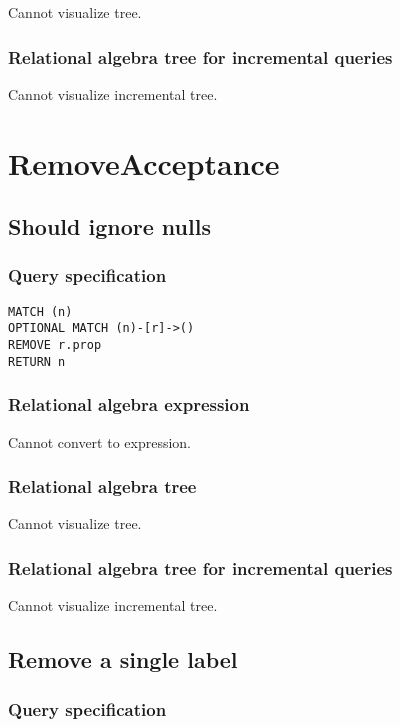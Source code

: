 Cannot visualize tree.

\subsubsection*{Relational algebra tree for incremental queries}

Cannot visualize incremental tree.

\section{RemoveAcceptance}

\subsection{Should ignore nulls}

\subsubsection*{Query specification}

\begin{lstlisting}
MATCH (n)
OPTIONAL MATCH (n)-[r]->()
REMOVE r.prop
RETURN n
\end{lstlisting}

\subsubsection*{Relational algebra expression}

Cannot convert to expression.

\subsubsection*{Relational algebra tree}

Cannot visualize tree.

\subsubsection*{Relational algebra tree for incremental queries}

Cannot visualize incremental tree.

\subsection{Remove a single label}

\subsubsection*{Query specification}

